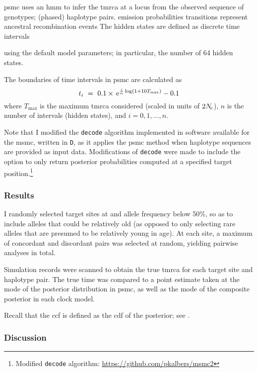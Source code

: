 \Gls{psmc} uses an \gls{hmm} to infer the \gls{tmrca} at a locus from the observed sequence of genotypes; \ie (phased) haplotype pairs.
emission probabilities
transitions represent ancestral recombination events
The hidden states are defined as discrete time intervals



using the default model parameters; in particular, the number of 64 hidden states.

The boundaries of time intervals in \gls{psmc} are calculated as
\begin{equation*}
	t_i ~=~ 0.1 \times \,\mathrm{e}^{\frac{i}{n}\log(1 + 10  T_{\max})} - 0.1
\end{equation*}
where $T_{\max}$ is the maximum \gls{tmrca} considered (scaled in units of $2N_{\!e}$), $n$ is the number of intervals (\ie hidden states), and ${i=0,1,\ldots,n}$.

Note that I modified the \texttt{decode} algorithm implemented in software available for the \gls{msmc}, written in \texttt{D}, as it applies the \gls{psmc} method when  haplotype sequences are provided as input data.
Modifications of \texttt{decode} were made to include the option to only return posterior probabilities computed at a specified target position.\footnote{Modified \texttt{decode} algorithm: \url{https://github.com/pkalbers/msmc2} }


%
\subsubsection{Results}
%

I randomly selected  target sites at  and allele frequency below 50\%, so as to include alleles that could be relatively old (as opposed to only selecting rare alleles that are presumed to be relatively young in age).
At each site, a maximum of  concordant and discordant pairs was selected at random, yielding  pairwise analyses in total.


Simulation records were scanned to obtain the true \gls{tmrca} for each target site and haplotype pair.
The true time was compared to a point estimate taken at the mode of the posterior distribution in \gls{psmc},
as well as the mode of the composite posterior in each clock model.


%

%



%

%


Recall that the \gls{ccf} is defined as the \gls{cdf} of the posterior; see .
%




%

%


%

%



%
\subsubsection{Discussion}
%
